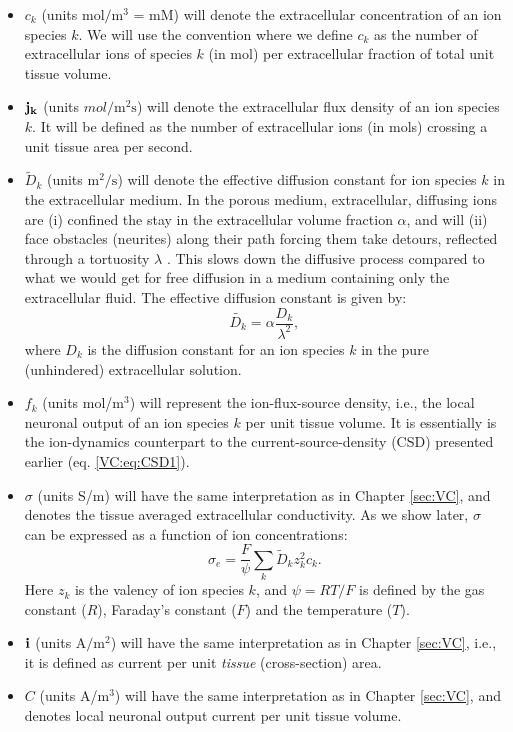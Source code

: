 \begin{itemize}
\item $c_k$ (units $\mathrm{mol/m^3}$ = mM) will denote the extracellular concentration of an ion species $k$. We will use the convention where we define $c_k$ as the number of extracellular ions of species $k$ (in mol) per extracellular fraction of total unit tissue volume. 

\item ${\bf j_k}$ (units $mol/\mathrm{m^2s}$) will denote the extracellular flux density of an ion species $k$. It will be defined as the number of extracellular ions (in mols) crossing a unit tissue area per second. 

\item $\tilde{D}_k$ (units $\mathrm{m^2/s}$) will denote the effective diffusion constant  for ion species $k$ in the extracellular medium. In the porous medium, extracellular, diffusing ions are (i) confined the stay in the extracellular volume fraction $\alpha$, and will (ii) face obstacles (neurites) along their path forcing them take detours, reflected through a tortuosity $\lambda$ \citep{Nicholson1998}. This slows down the diffusive process compared to what we would get for free diffusion in a medium containing only the extracellular fluid. The effective diffusion constant is given by:
\begin{equation}
\tilde{D_k} = \alpha \frac{D_k}{\lambda^2}, 
\label{Eldiff:eq:diffconst}
\end{equation}
where $D_k$ is the diffusion constant for an ion species $k$ in the pure (unhindered) extracellular solution.

\item $f_k$ (units mol/m$^3$) will represent the ion-flux-source density, i.e., the local neuronal output of an ion species $k$ per unit tissue volume. It is essentially is the ion-dynamics counterpart to the current-source-density (CSD) presented earlier (eq. \ref{VC:eq:CSD1}).

\item $\sigma$ (units S/m) will have the same interpretation as in Chapter \ref{sec:VC}, and denotes the tissue averaged extracellular conductivity. As we show later, $\sigma$ can be expressed as a function of ion concentrations:
\begin{equation}
\sigma_e = \frac{F}{\psi}\sum_{k} \tilde{D}_k z_{k}^2 c_{k}.
\label{Eldiff:eq:sigma1}
\end{equation}
Here $z_{k}$ is the valency of ion species $k$, and $\psi=RT/F$ is defined by the gas constant ($R$), Faraday's constant ($F$) and the temperature ($T$).

\item  ${\bf i}$ (units $\mathrm{A/m^2}$) will have the same interpretation as in Chapter \ref{sec:VC}, i.e., it is defined as current per unit \textit{tissue} (cross-section) area.

\item $C$ (units A/m$^3$) will have the same interpretation as in Chapter \ref{sec:VC}, and denotes local neuronal output current per unit tissue volume.

\end{itemize}

